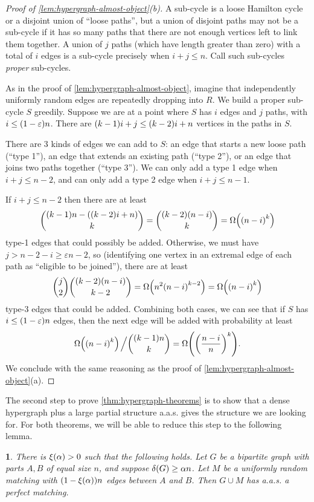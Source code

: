 \documentclass[11pt,english]{article}
\theoremstyle{plain}
\theoremstyle{definition}
\theoremstyle{definition}
\theoremstyle{plain}
\theoremstyle{plain}
\theoremstyle{plain}
\newtheorem{lem}[thm]{\protect\lemmaname}
\theoremstyle{plain}
\theoremstyle{remark}
\theoremstyle{remark}
\let\originalleft\left
\let\originalright\right
\renewcommand{\left}{\mathopen{}\mathclose\bgroup\originalleft}
\renewcommand{\right}{\aftergroup\egroup\originalright}
\providecommand{\lemmaname}{Lemma}
\begin{document}
\begin{proof}
[Proof of \ref{lem:hypergraph-almost-object}(b)]A sub-cycle is a
loose Hamilton cycle or a disjoint union of ``loose paths'', but
a union of disjoint paths may not be a sub-cycle if it has so many
paths that there are not enough vertices left to link them together.
A union of $j$ paths (which have length greater than zero) with a
total of $i$ edges is a sub-cycle precisely when $i+j\le n$. Call
such sub-cycles \emph{proper }sub-cycles.

As in the proof of \ref{lem:hypergraph-almost-object}, imagine that
independently uniformly random edges are repeatedly dropping into
$R$. We build a proper sub-cycle $S$ greedily. Suppose we are at
a point where $S$ has $i$ edges and $j$ paths, with $i\le\left(1-\varepsilon\right)n$.
There are $\left(k-1\right)i+j\le\left(k-2\right)i+n$ vertices in
the paths in $S$.

There are 3 kinds of edges we can add to $S$: an edge that starts
a new loose path (``type 1''), an edge that extends an existing
path (``type 2''), or an edge that joins two paths together (``type
3''). We can only add a type 1 edge when $i+j\le n-2$, and can only
add a type 2 edge when $i+j\le n-1$.

If $i+j\le n-2$ then there are at least
\[
{\left(k-1\right)n-\left(\left(k-2\right)i+n\right) \choose k}={\left(k-2\right)\left(n-i\right) \choose k}=\Omega\left(\left(n-i\right)^{k}\right)
\]
type-1 edges that could possibly be added. Otherwise, we must have
$j>n-2-i\ge\varepsilon n-2$, so (identifying one vertex in an extremal
edge of each path as ``eligible to be joined''), there are at least
\[
{j \choose 2}{\left(k-2\right)\left(n-i\right) \choose k-2}=\Omega\left(n^{2}\left(n-i\right)^{k-2}\right)=\Omega\left(\left(n-i\right)^{k}\right)
\]
type-3 edges that could be added. Combining both cases, we can see
that if $S$ has $i\le\left(1-\varepsilon\right)n$ edges, then the
next edge will be added with probability at least
\[
\Omega\left(\left(n-i\right)^{k}\right)\left.\vphantom{\sum}\right/{\left(k-1\right)n \choose k}=\Omega\left(\left(\frac{n-i}{n}\right)^{k}\right).
\]
We conclude with the same reasoning as the proof of \ref{lem:hypergraph-almost-object}(a).
\end{proof}
The second step to prove \ref{thm:hypergraph-theorems} is to show that a dense
hypergraph plus a large partial structure a.a.s. gives the structure
we are looking for. For both theorems, we will be able to reduce this
step to the following lemma.
\begin{lem}
\label{lem:bipartite-plus-big-matching-perfect}There is $\xi\left(\alpha\right)>0$
such that the following holds. Let $G$ be a bipartite graph with
parts $A,B$ of equal size $n$, and suppose $\delta\left(G\right)\ge\alpha n$.
Let $M$ be a uniformly random matching with $\left(1-\xi\left(\alpha\right)\right)n$
edges between $A$ and $B$. Then $G\cup M$ has a.a.s. a perfect matching.
\end{lem}
\end{document}
